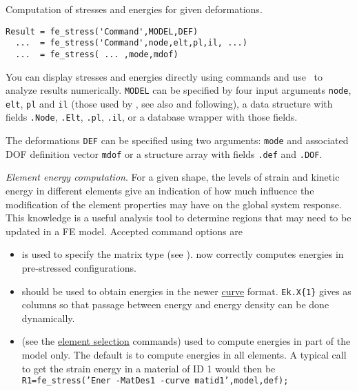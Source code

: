 

\noindent Computation of stresses and energies for given deformations.

\rsyntax\begin{verbatim}
Result = fe_stress('Command',MODEL,DEF)
  ...  = fe_stress('Command',node,elt,pl,il, ...)
  ...  = fe_stress( ... ,mode,mdof)
\end{verbatim}


You can display stresses and energies directly using  commands and use \festress\ to analyze results numerically. {\tt MODEL} can be specified by four input arguments {\tt node}, {\tt elt}, {\tt pl} and {\tt il} (those used by \femk, see also  and following), a data structure with fields {\tt .Node}, {\tt .Elt}, {\tt .pl}, {\tt .il}, or a database wrapper with those fields.

The deformations {\tt DEF} can be specified using two arguments: {\tt mode} and associated DOF definition vector {\tt mdof} or a structure array with fields {\tt .def} and {\tt .DOF}.


{\sl Element energy computation}.  For a given shape, the levels of strain and kinetic energy in different elements give an indication of how much influence the modification of the element properties may have on the global system response. This knowledge is a useful analysis tool to determine regions that may need to be updated in a FE model. Accepted command options are 

\begin{itemize}
\item {} is used to specify the matrix type (see ).  now correctly computes energies in pre-stressed configurations. 
\item {} should be used to obtain energies in the newer \hyperlink{curve}{curve} format. {\tt Ek.X\{1\}} gives as columns  so that passage between energy and energy density can be done dynamically. 

\item {} (see the \hyperlink{findelt}{element selection} commands) used to compute energies in part of the model only. The default is to compute energies in all elements. A typical call to get the strain energy in a material of ID 1 would then be
{\tt R1=fe\_stress('Ener -MatDes1 -curve matid1',model,def);}

\end{itemize}

